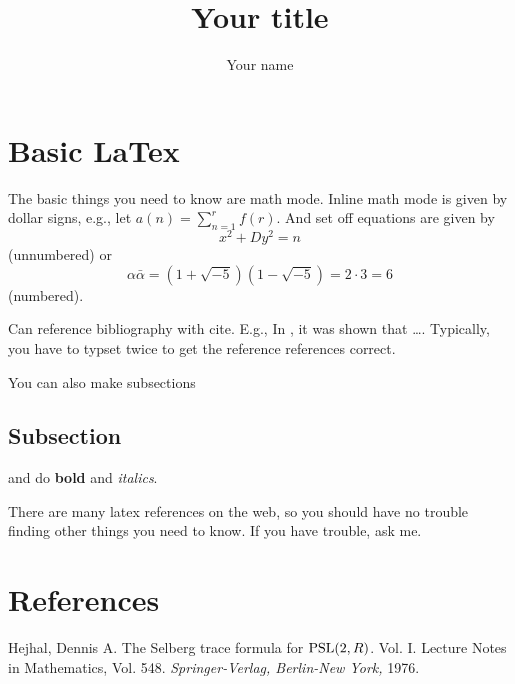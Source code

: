 \documentclass[11pt]{article}
\title{Your title}
\author{Your name}
\begin{document}
\maketitle

\section{Basic LaTex}

The basic things you need to know are math mode.  Inline math mode is given by dollar
signs, e.g., let $a(n) = \sum_{n=1}^r f(r)$.  And set off equations are given by
\[ x^2 + Dy^2 = n \]
(unnumbered)
or
\begin{equation}
  \alpha \bar \alpha = (1+\sqrt{-5})(1-\sqrt{-5}) = 2 \cdot 3 = 6
\end{equation}
(numbered).

Can reference bibliography with cite.  E.g., In \cite{Hej}, it was shown that \dots.
Typically, you have to typset twice to get the reference references correct.

You can also make subsections

\subsection{Subsection}

and do {\bf bold} and {\em italics}.

\medskip
\noindent
There are many latex references on the web, so you should have no trouble finding other
things you need to know.  If you have trouble, ask me.

\section*{References}

\begin{enumerate}

 Hejhal, Dennis A. The Selberg trace formula for ${\rm PSL}(2,R)$. Vol. I. Lecture Notes in Mathematics, Vol. 548. {\em Springer-Verlag, Berlin-New York,} 1976.

\end{enumerate}
\end{document}
